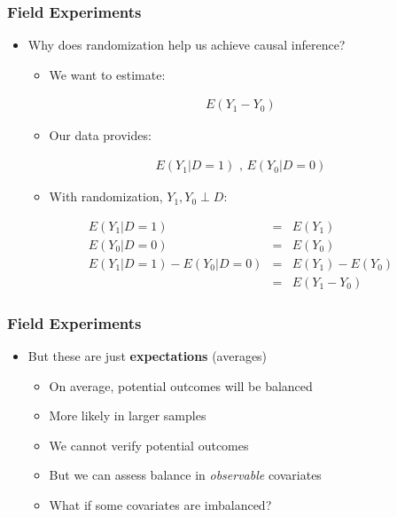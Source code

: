 \documentclass[xcolor=x11names,compress]{beamer}\usepackage[]{graphicx}\usepackage[]{color}
\renewcommand{\(}{\begin{columns}}
\renewcommand{\)}{\end{columns}}
\newcommand{\<}[1]{\begin{column}{#1}}
\renewcommand{\>}{\end{column}}
\begin{document}
\begin{frame}
\frametitle{Field Experiments}
\begin{itemize}
\item Why does randomization help us achieve causal inference?
\begin{itemize}
\item We want to estimate:
\end{itemize}
\begin{eqnarray}
E(Y_1 - Y_0)
\end{eqnarray}
\pause
\begin{itemize}
\item Our data provides:
\end{itemize}
\begin{eqnarray}
E(Y_1|D=1)\text{ ,  }E(Y_0|D=0)
\end{eqnarray}
\pause
\begin{itemize}
\item With randomization, $Y_1, Y_0 \perp D$:
\end{itemize}
\begin{eqnarray}
E(Y_1|D=1) &=& E(Y_1) \\
E(Y_0|D=0) &=& E(Y_0) \\
E(Y_1|D=1) - E(Y_0|D=0) &=& E(Y_1) - E(Y_0) \\
&=& E(Y_1 - Y_0)
\end{eqnarray}
\end{itemize}
\end{frame}

\begin{frame}
\frametitle{Field Experiments}
\begin{itemize}
\item But these are just \textbf{expectations} (averages)
\pause
\begin{itemize}
\item On average, potential outcomes will be balanced
\item More likely in larger samples
\item We cannot verify potential outcomes
\item But we can assess balance in \textit{observable} covariates
\item What if some covariates are imbalanced? %
\end{itemize}
\end{itemize}
\end{frame}
\end{document}
